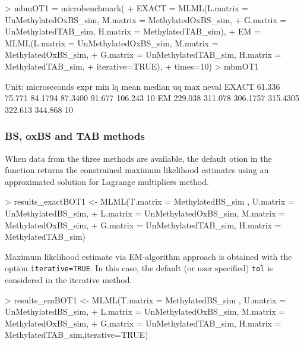 \documentclass{article}
\begin{document}
\begin{Schunk}
\begin{Sinput}
>  mbmOT1 = microbenchmark(
+     EXACT = MLML(L.matrix = UnMethylatedOxBS_sim, M.matrix = MethylatedOxBS_sim,
+                  G.matrix = UnMethylatedTAB_sim, H.matrix = MethylatedTAB_sim),
+     EM =    MLML(L.matrix = UnMethylatedOxBS_sim, M.matrix = MethylatedOxBS_sim,
+                  G.matrix = UnMethylatedTAB_sim, H.matrix = MethylatedTAB_sim,
+                  iterative=TRUE),
+     times=10)
>  mbmOT1
\end{Sinput}
\begin{Soutput}
Unit: microseconds
  expr     min      lq     mean   median      uq     max neval
 EXACT  61.336  75.771  84.1794  87.3400  91.677 106.243    10
    EM 229.038 311.078 306.1757 315.4305 322.613 344.868    10
\end{Soutput}
\end{Schunk}



\subsubsection{BS, oxBS and TAB methods}

When data from the three methods are available, the default otion in the  function returns the constrained maximum likelihood estimates using an approximated solution for Lagrange multipliers method.


\begin{Schunk}
\begin{Sinput}
> results_exactBOT1 <- MLML(T.matrix = MethylatedBS_sim , U.matrix = UnMethylatedBS_sim,
+ L.matrix = UnMethylatedOxBS_sim, M.matrix = MethylatedOxBS_sim,
+ G.matrix = UnMethylatedTAB_sim, H.matrix = MethylatedTAB_sim)
\end{Sinput}
\end{Schunk}

Maximum likelihood estimate via EM-algorithm approach \cite{Qu:MLML} is obtained with the option \verb|iterative=TRUE|. In this case, the default (or user specified) \verb|tol| is considered in the iterative method.

\begin{Schunk}
\begin{Sinput}
>  results_emBOT1 <- MLML(T.matrix = MethylatedBS_sim , U.matrix = UnMethylatedBS_sim,
+  L.matrix = UnMethylatedOxBS_sim, M.matrix = MethylatedOxBS_sim,
+  G.matrix = UnMethylatedTAB_sim, H.matrix = MethylatedTAB_sim,iterative=TRUE)
\end{Sinput}
\end{Schunk}
\end{document}
